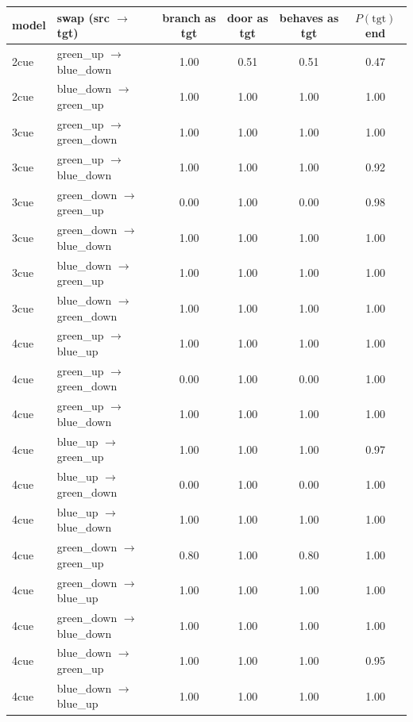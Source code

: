 \documentclass[11pt]{article}
\newcommand{\ok}[1]{\textcolor{envgreen}{#1}}
\newcommand{\bad}[1]{\textcolor{warnred}{#1}}
\begin{document}
\begin{table}[h]
\centering\small
\begin{tabular}{llcccc}
\toprule
model & swap (src $\rightarrow$ tgt) & branch as tgt & door as tgt & behaves as tgt & $P(\text{tgt})$ end \\
\midrule
2cue & green\_up $\rightarrow$ blue\_down & 1.00 & \bad{0.51} & \bad{0.51} & 0.47 \\
2cue & blue\_down $\rightarrow$ green\_up & 1.00 & 1.00 & \ok{1.00} & 1.00 \\
\midrule
3cue & green\_up $\rightarrow$ green\_down & 1.00 & 1.00 & \ok{1.00} & 1.00 \\
3cue & green\_up $\rightarrow$ blue\_down  & 1.00 & 1.00 & \ok{1.00} & 0.92 \\
3cue & green\_down $\rightarrow$ green\_up & \bad{0.00} & 1.00 & \bad{0.00} & 0.98 \\
3cue & green\_down $\rightarrow$ blue\_down & 1.00 & 1.00 & \ok{1.00} & 1.00 \\
3cue & blue\_down $\rightarrow$ green\_up  & 1.00 & 1.00 & \ok{1.00} & 1.00 \\
3cue & blue\_down $\rightarrow$ green\_down & 1.00 & 1.00 & \ok{1.00} & 1.00 \\
\midrule
4cue & green\_up $\rightarrow$ blue\_up    & 1.00 & 1.00 & \ok{1.00} & 1.00 \\
4cue & green\_up $\rightarrow$ green\_down & \bad{0.00} & 1.00 & \bad{0.00} & 1.00 \\
4cue & green\_up $\rightarrow$ blue\_down  & 1.00 & 1.00 & \ok{1.00} & 1.00 \\
4cue & blue\_up $\rightarrow$ green\_up    & 1.00 & 1.00 & \ok{1.00} & 0.97 \\
4cue & blue\_up $\rightarrow$ green\_down  & \bad{0.00} & 1.00 & \bad{0.00} & 1.00 \\
4cue & blue\_up $\rightarrow$ blue\_down   & 1.00 & 1.00 & \ok{1.00} & 1.00 \\
4cue & green\_down $\rightarrow$ green\_up & 0.80 & 1.00 & 0.80 & 1.00 \\
4cue & green\_down $\rightarrow$ blue\_up  & 1.00 & 1.00 & \ok{1.00} & 1.00 \\
4cue & green\_down $\rightarrow$ blue\_down & 1.00 & 1.00 & \ok{1.00} & 1.00 \\
4cue & blue\_down $\rightarrow$ green\_up  & 1.00 & 1.00 & \ok{1.00} & 0.95 \\
4cue & blue\_down $\rightarrow$ blue\_up   & 1.00 & 1.00 & \ok{1.00} & 1.00 \\

\end{tabular}
\end{table}
\end{document}
